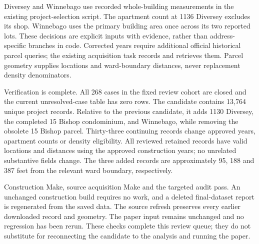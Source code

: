 Diversey and Winnebago use recorded whole-building measurements in the existing project-selection script. The apartment count at 1136 Diversey excludes its shop. Winnebago uses the primary building area once across its two reported lots. These decisions are explicit inputs with evidence, rather than address-specific branches in code. Corrected years require additional official historical parcel queries; the existing acquisition task records and retrieves them. Parcel geometry supplies locations and ward-boundary distances, never replacement density denominators.

Verification is complete. All 268 cases in the fixed review cohort are closed and the current unresolved-case table has zero rows. The candidate contains 13,764 unique project records. Relative to the previous candidate, it adds 1130 Diversey, the completed 15 Bishop condominium, and Winnebago, while removing the obsolete 15 Bishop parcel. Thirty-three continuing records change approved years, apartment counts or density eligibility. All reviewed retained records have valid locations and distances using the approved construction years; no unrelated substantive fields change. The three added records are approximately 95, 188 and 387 feet from the relevant ward boundary, respectively.

Construction Make, source acquisition Make and the targeted audit pass. An unchanged construction build requires no work, and a deleted final-dataset report is regenerated from the saved data. The source refresh preserves every earlier downloaded record and geometry. The paper input remains unchanged and no regression has been rerun. These checks complete this review queue; they do not substitute for reconnecting the candidate to the analysis and running the paper.
